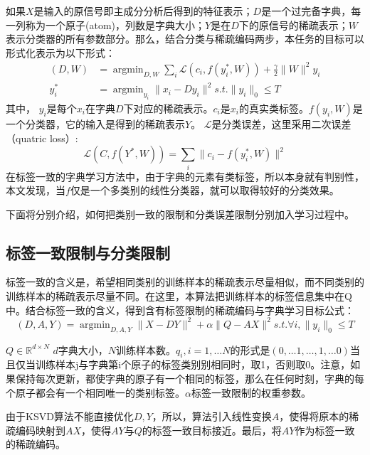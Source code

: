    如果$X$是输入的原信号即主成分分析后得到的特征表示；$D$是一个过完备字典，每一列称为一个原子(atom)，列数是字典大小；$Y$是在$D$下的原信号的稀疏表示；$W$表示分类器的所有参数部分。那么，结合分类与稀疏编码两步，本任务的目标可以形式化表示为以下形式：
    \begin{equation}
    \label{alg:all-ksvd}
    \begin{split}
        (D, W) & = \mathop{\arg \min}_{D, W} \sum_i \mathcal{L} (c_i, f(y_i^*, W)) + \frac{\gamma}{2}\|W\| ^2
        y_i \\
        y_i^* & = \mathop{\arg \min}_{y_i} \|x_i - Dy_i\| ^2 s.t. \|y_i\|_0 \le T
    \end{split}
    \end{equation}
    其中， $y_i$是每个$x_i$在字典$D$下对应的稀疏表示。$c_i$是$x_i$的真实类标签。$f(y_i, W)$是一个分类器，它的输入是得到的稀疏表示$Y$。 $\mathcal{L}$是分类误差，这里采用二次误差（quatric loss）:
    \begin{equation}
        \mathcal{L}(C, f(Y^*, W)) = \sum _i \|c_i - f(y_i^* , W) \| ^2 
    \end{equation}
    在标签一致的字典学习方法中，由于字典的元素有类标签，所以本身就有判别性，本文发现，当$f$仅是一个多类别的线性分类器，就可以取得较好的分类效果。

    下面将分别介绍，如何把类别一致的限制和分类误差限制分别加入学习过程中。

    \subsection{标签一致限制与分类限制}
    标签一致的含义是，希望相同类别的训练样本的稀疏表示尽量相似，而不同类别的训练样本的稀疏表示尽量不同。在这里，本算法把训练样本的标签信息集中在Q中。结合标签一致的含义，得到含有标签限制的稀疏编码与字典学习目标公式：
    \begin{equation}
    \label{alg:lc-ksvd1}
    (D, A, Y) = \mathop{\arg \min} _{D, A, Y} \|X - DY\| ^ 2 + \alpha\|Q - AX\|^2 s.t. \forall i, \|y_i\|_0 \le T
    \end{equation}

     $Q\in \mathbb{R}^{d \times N}$ $d$字典大小，$N$训练样本数。$q_i, i = 1, \dots N$的形式是$(0, \dots 1, \dots, 1, \dots 0)$当且仅当训练样本j与字典第i个原子的标签类别别相同时，取1，否则取0。注意，如果保持每次更新，都使字典的原子有一个相同的标签，那么在任何时刻，字典的每个原子都会有一个相同唯一的类别标签。$\alpha $标签一致限制的权重参数。

    由于KSVD算法不能直接优化$D, Y$，所以，算法引入线性变换$A$，使得将原本的稀疏编码映射到$AX$，使得$AY$与$Q$的标签一致目标接近。最后，将$AY$作为标签一致的稀疏编码。




